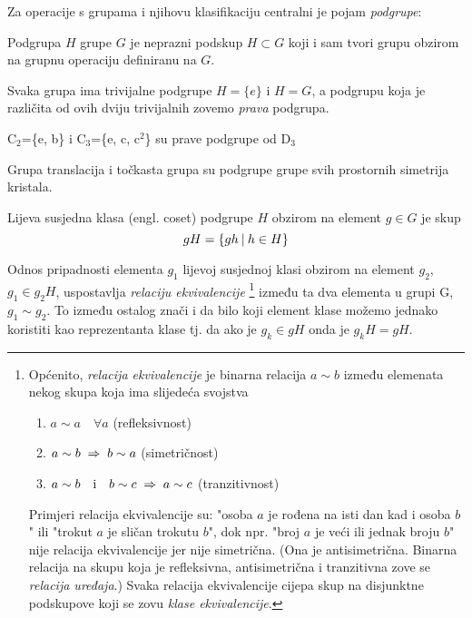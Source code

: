 Za operacije s grupama i njihovu klasifikaciju centralni je pojam \emph{podgrupe}:

\begin{definicija}[Podgrupa]
Podgrupa $H$ grupe $G$ je neprazni podskup $H\subset G$ koji i sam
tvori grupu obzirom na grupnu operaciju definiranu na $G$.
\end{definicija}

Svaka grupa ima trivijalne podgrupe $H=\{e\}$ i $H=G$, a
podgrupu koja je različita od ovih dviju trivijalnih
zovemo \emph{prava} podgrupa.

\begin{primjer} \label{th:c2c3}
C$_2$=\{e, b\} i C$_3$=\{e, c, c$^2$\} su prave podgrupe od D$_3$
\end{primjer}

\begin{primjer}
Grupa translacija i točkasta grupa su podgrupe grupe svih prostornih
simetrija kristala.
\end{primjer}

\begin{definicija}
Lijeva susjedna klasa (engl. coset) podgrupe $H$ obzirom na element
$g\in G$ je skup
\begin{displaymath}
     gH=\{gh \: | \: h\in H\}
\end{displaymath}
\end{definicija}

Odnos pripadnosti elementa $g_1$ lijevoj susjednoj klasi obzirom na element $g_2$,  
$g_1 \in g_2 H$, uspostavlja \emph{relaciju ekvivalencije}%
\footnote{\label{fn:ekviv}
Općenito, \emph{relacija ekvivalencije} je binarna relacija $a\sim b$ između
elemenata nekog
skupa koja ima slijedeća svojstva
\begin{enumerate}
\item $a\sim a \quad \forall a$ \qquad (refleksivnost)
\item $a\sim b \;\Rightarrow\; b\sim a$   \qquad (simetričnost)
\item $a\sim b \quad \textrm{i}\quad  b\sim c \;\Rightarrow\; a\sim c$  \qquad (tranzitivnost)
\end{enumerate}
Primjeri relacija ekvivalencije su: "osoba $a$ je rođena na isti dan kad i osoba $b$"
ili "trokut $a$ je sličan trokutu $b$", dok npr. "broj $a$ je veći ili jednak
broju $b$" nije relacija ekvivalencije jer nije simetrična.
(Ona je antisimetrična. Binarna relacija na skupu koja je refleksivna, antisimetrična
i tranzitivna zove se \emph{relacija uređaja}.)
Svaka relacija ekvivalencije cijepa skup na disjunktne podskupove 
koji se zovu \emph{klase ekvivalencije}.} između ta dva elementa u grupi G, $g_1 \sim g_2$.
To između ostalog znači i da bilo koji element klase možemo jednako koristiti
kao reprezentanta klase tj. da ako je $g_k \in gH$ onda je $g_{k}H = gH$.

